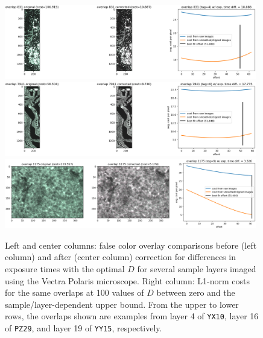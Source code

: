 \documentclass[letterpaper,11pt]{article}
\begin{document}
\begin{figure}[!ht]
\centering
\includegraphics[width=0.98\textwidth]{images/methods/cost_examples_polaris/overlay_comp_random_4357_offset=51.980}
\includegraphics[width=0.98\textwidth]{images/methods/cost_examples_polaris/overlay_comp_random_2668_offset=51.848}
\includegraphics[width=0.98\textwidth]{images/methods/cost_examples_polaris/overlay_comp_random_1554_offset=51.000}
\caption{\footnotesize Left and center columns: false color overlay comparisons before (left column) and after (center column) correction for differences in exposure times with the optimal $D$ for several sample layers imaged using the Vectra Polaris microscope. Right column: L1-norm costs for the same overlaps at 100 values of $D$ between zero and the sample/layer-dependent upper bound. From the upper to lower rows, the overlaps shown are examples from layer 4 of \texttt{YX10}, layer 16 of \texttt{PZ29}, and layer 19 of \texttt{YY15}, respectively.}
\label{fig:overlap_cost_examples_polaris_1}
\end{figure}
\end{document}

